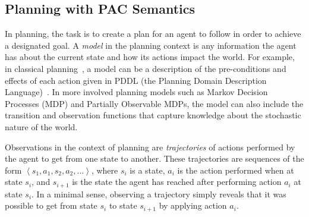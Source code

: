\documentclass[12pt]{article}
\newcommand{\tuple}[1]{\ensuremath{\left \langle #1 \right \rangle }}
\begin{document}




\subsection{Planning with PAC Semantics}

In planning, the task is to create a plan for an agent to follow in order to achieve a designated goal. A {\em model} in the planning context is any information the agent has about the current state and how its actions impact the world. For example, in classical planning~\cite{fikes1971strips}, a model can be a description of the pre-conditions and effects of each action given in PDDL (the Planning Domain Description Language)~\cite{mcdermott1998pddl}. In more involved planning models such as Markov Decision Processes (MDP) and Partially Observable MDPs, the model can also include the transition and observation functions that capture knowledge about the stochastic nature of the world. 


Observations in the context of planning are {\em trajectories} of actions performed by the agent to get from one state to another. These trajectories are sequences of the form $\tuple{ s_1, a_1, s_2, a_2, \ldots}$, where $s_i$ is a state, $a_i$ is the action performed when at state $s_i$, and $s_{i+1}$ is the state the agent has reached after performing action $a_i$ at state $s_i$. In a minimal sense, observing a trajectory simply reveals that it was possible to get from state $s_i$ to state $s_{i+1}$ by applying action $a_i$. %
\end{document}
